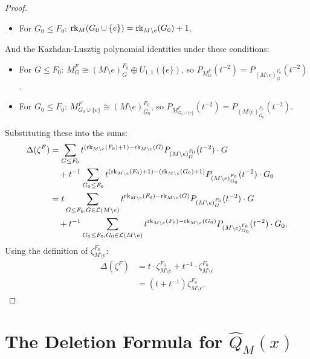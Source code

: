 \documentclass[11pt]{article}
\newcommand{\calL}{\mathcal{L}}
\newcommand{\rank}{\normalfont\text{rk}}
\theoremstyle{remark}
\begin{document}
\begin{proof}
\begin{itemize}
        \item For $G_0 \leq F_0$: $\rank_M(G_0 \cup \{e\}) = \rank_{M\setminus e}(G_0) + 1$.
    \end{itemize}
    And the Kazhdan-Lusztig polynomial identities under these conditions:
    \begin{itemize}
        \item For $G \leq F_0$: $M_G^F \cong (M\setminus e)_G^{F_0} \oplus U_{1,1}(\{e\})$, so $P_{M_G^F}(t^{-2}) = P_{(M\setminus e)_G^{F_0}}(t^{-2})$.
        \item For $G_0 \leq F_0$: $M_{G_0 \cup \{e\}}^{F} \cong (M\setminus e)_{G_0}^{F_0}$, so $P_{M_{G_0 \cup \{e\}}^{F}}(t^{-2}) = P_{(M\setminus e)_{G_0}^{F_0}}(t^{-2})$.
    \end{itemize}
    Substituting these into the sums:
    \begin{align*}
        \Delta(\zeta^F) & = \sum_{G \leq F_0} t^{(\rank_{M\setminus e}(F_0) + 1) - \rank_{M\setminus e}(G)} P_{(M\setminus e)_G^{F_0}}(t^{-2}) \cdot G                                                \\
                        & \quad + t^{-1} \sum_{G_0 \leq F_0} t^{(\rank_{M\setminus e}(F_0) + 1) - (\rank_{M\setminus e}(G_0) + 1)} P_{(M\setminus e)_{G_0}^{F_0}}(t^{-2}) \cdot G_0                   \\
                        & = t \sum_{G \leq F_0, G \in \calL(M\setminus e)} t^{\rank_{M\setminus e}(F_0) - \rank_{M\setminus e}(G)} P_{(M\setminus e)_G^{F_0}}(t^{-2}) \cdot G                         \\
                        & \quad + t^{-1} \sum_{G_0 \leq F_0, G_0 \in \calL(M\setminus e)} t^{\rank_{M\setminus e}(F_0) - \rank_{M\setminus e}(G_0)} P_{(M\setminus e)_{G_0}^{F_0}}(t^{-2}) \cdot G_0.
    \end{align*}
    Using the definition of $\zeta^{F_0}_{M\setminus e}$:
    \begin{align*}
        \Delta(\zeta^F) & = t \cdot \zeta^{F_0}_{M\setminus e} + t^{-1} \cdot \zeta^{F_0}_{M\setminus e} \\
                        & = (t + t^{-1})\zeta^{F_0}_{M\setminus e}.
    \end{align*}
\end{proof}

\section{The Deletion Formula for $\hat{Q}_M(x)$}
\label{sec:deletion_formula}
\end{document}
